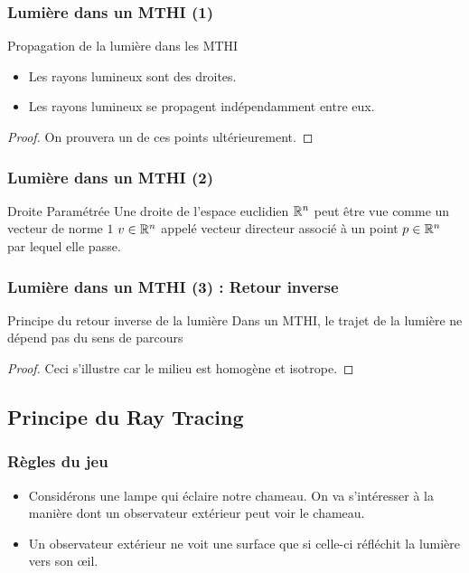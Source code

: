 \documentclass{beamercours}
\begin{document}
\begin{frame}
\frametitle{Lumière dans un MTHI (1)}
\begin{théorème}{Propagation de la lumière dans les MTHI}{}
	\begin{itemize}
		\item Les rayons lumineux sont des droites.
		\item Les rayons lumineux se propagent indépendamment entre eux.
	\end{itemize}
\end{théorème}
\begin{proof}
	On prouvera un de ces points ultérieurement.
\end{proof}
\end{frame}
\begin{frame}
\frametitle{Lumière dans un MTHI (2)}
\begin{propositionfr}{Droite Paramétrée}{}
	Une droite de l'espace euclidien $\mathbb{R}^{n}$ peut être vue comme un vecteur de norme $1$ $v \in \mathbb{R}^{n}$ appelé vecteur directeur associé à un point $p \in \mathbb{R}^{n}$ par lequel elle passe.
\end{propositionfr}
\end{frame}
\begin{frame}
\frametitle{Lumière dans un MTHI (3) : Retour inverse}
\begin{théorème}{Principe du retour inverse de la lumière}{}
Dans un MTHI, le trajet de la lumière ne dépend pas du sens de parcours
\end{théorème}
\begin{proof}
	Ceci s'illustre car le milieu est homogène et isotrope.
\end{proof}
\end{frame}

\subsection{Principe du Ray Tracing}

\begin{frame}
\frametitle{Règles du jeu}
\begin{itemize}
\item Considérons une lampe qui éclaire notre chameau. On va s'intéresser à la manière dont un observateur extérieur peut voir le chameau.
\item Un observateur extérieur ne voit une surface que si celle-ci réfléchit la lumière vers son \oe il.
\end{itemize}
\end{frame}
\end{document}
